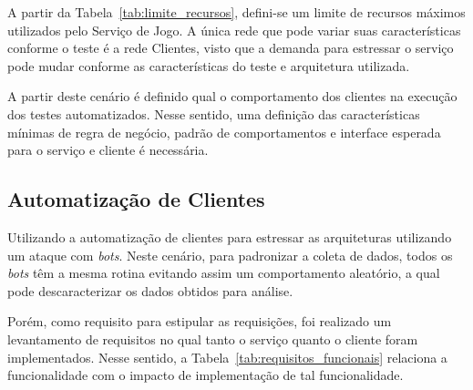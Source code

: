 A partir da Tabela~\ref{tab:limite_recursos}, defini-se um limite de recursos máximos utilizados pelo Serviço de Jogo.
%
A única rede que pode variar suas características conforme o teste é a rede Clientes, visto que a demanda para estressar o serviço pode mudar conforme as características do teste e arquitetura utilizada.

A partir deste cenário é definido qual o comportamento dos clientes na execução dos testes automatizados.
%
Nesse sentido, uma definição das características mínimas de regra de negócio, padrão de comportamentos e interface esperada para o serviço e cliente é necessária.



\subsection{Automatização de Clientes}
\label{sec:SimulaCliente}



Utilizando a automatização de clientes para estressar as arquiteturas utilizando um ataque com \textit{bots}.
%
Neste cenário, para padronizar a coleta de dados, todos os \textit{bots} têm a mesma rotina evitando assim um comportamento aleatório, a qual pode descaracterizar os dados obtidos para análise.



Porém, como requisito para estipular as requisições, foi realizado um levantamento de requisitos no qual tanto o serviço quanto o cliente foram implementados.
%
Nesse sentido, a Tabela~\ref{tab:requisitos_funcionais} relaciona a funcionalidade com o impacto de implementação de tal funcionalidade.



